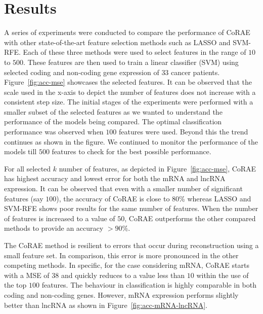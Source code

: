 \documentclass{bioinfo}
\begin{document}
\section{Results}
A series of experiments were conducted to compare the performance of CoRAE with other state-of-the-art feature selection methods such as LASSO and SVM-RFE.
Each of these three methods were used to select features in the range of $10$ to $500$.
These features are then used to train a linear classifier (SVM) using selected coding and non-coding gene expression of $33$ cancer patients. 
Figure~\ref{fig:acc-mse} showcases the selected features. It can be observed that the scale used in the x-axis to depict the number of features does not increase with a consistent step size.
The initial stages of the experiments were performed with a smaller subset of the selected features as we wanted to understand the performance of the models being compared.
The optimal classification performance was observed when $100$ features were used.
Beyond this the trend continues as shown in the figure. We continued to monitor the performance of the models till $500$ features to check for the best possible performance. 

For all selected $k$ number of features, as depicted in Figure~\ref{fig:acc-mse}, CoRAE has highest accuracy and lowest error for both the mRNA and lncRNA expression.
It can be observed that even with a smaller number of significant features (say $100$), the accuracy of CoRAE is close to 80\% whereas LASSO and SVM-RFE shows poor results for the same number of features.
When the number of features is increased to a value of $50$, CoRAE outperforms the other compared methods to provide an accuracy $> 90\%$.

The CoRAE method is resilient to errors that occur during reconstruction using a small feature set. In comparison, this error is more pronounced in the other competing methods.
In specific, for the case considering mRNA, CoRAE starts with a MSE of $38$ and quickly reduces to a value less than $10$ within the use of the top $100$ features. 
The behaviour in classification is highly comparable in both coding and non-coding genes.
However, mRNA expression performs slightly better than lncRNA as shown in Figure~\ref{fig:acc-mRNA-lncRNA}.
\end{document}
